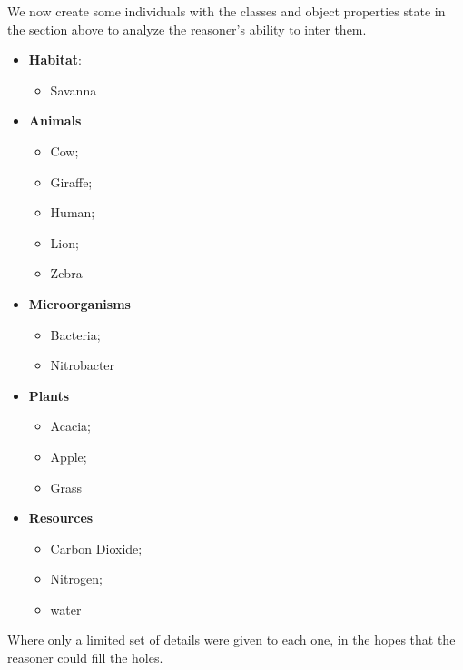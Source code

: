 We now create some individuals with the classes and object properties state in the section above to analyze the reasoner's ability to inter them.


\begin{itemize}
    \item \textbf{Habitat}:
    \begin{itemize}
        \item Savanna
    \end{itemize}
    \item \textbf{Animals}
    \begin{itemize}
        \item Cow;
        \item Giraffe;
        \item Human;
        \item Lion;
        \item Zebra
    \end{itemize}
    \item \textbf{Microorganisms}
    \begin{itemize}
        \item Bacteria;
        \item Nitrobacter
    \end{itemize}
    \item \textbf{Plants}
    \begin{itemize}
        \item Acacia;
        \item Apple;
        \item Grass
    \end{itemize}
    \item \textbf{Resources}
    \begin{itemize}
        \item Carbon Dioxide;
        \item Nitrogen;
        \item water
    \end{itemize}
\end{itemize}

Where only a limited set of details were given to each one, in the hopes that the reasoner could fill the holes.


